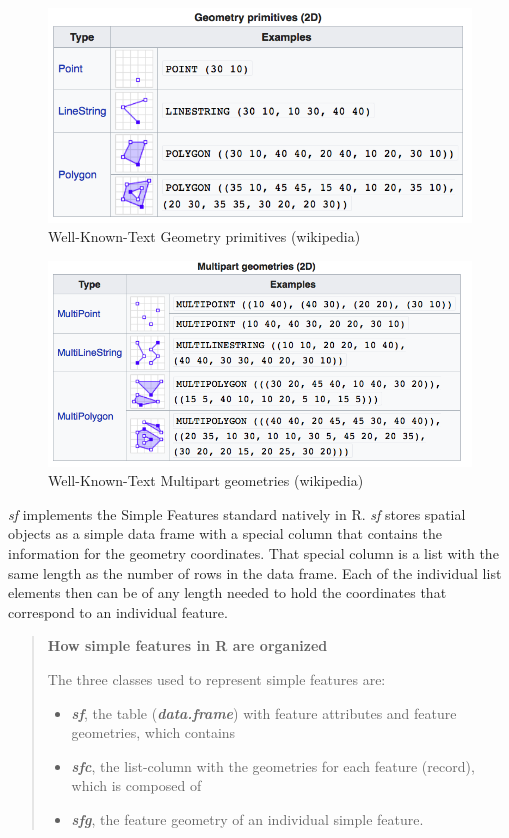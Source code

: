 \documentclass[
  11pt,
]{book}
\providecommand{\tightlist}{%
  \setlength{\itemsep}{0pt}\setlength{\parskip}{0pt}}
\begin{document}
\begin{figure}
\includegraphics[width=1\linewidth]{img/wkt_primitives} \caption{Well-Known-Text Geometry primitives  (wikipedia)}\label{fig:wkt-primitives-sp}
\end{figure}

\begin{figure}
\includegraphics[width=1\linewidth]{img/wkt_multipart} \caption{Well-Known-Text Multipart geometries (wikipedia)}\label{fig:wkt-multipart-sp}
\end{figure}

\emph{sf} implements the Simple Features standard natively in R. \emph{sf} stores spatial objects as a simple data frame with a special column that contains the information for the geometry coordinates. That special column is a list with the same length as the number of rows in the data frame. Each of the individual list elements then can be of any length needed to hold the coordinates that correspond to an individual feature.

\begin{quote}
\textbf{How simple features in R are organized}

The three classes used to represent simple features are:

\begin{itemize}
\tightlist
\item
  \textbf{\emph{sf}}, the table (\textbf{\emph{data.frame}}) with feature attributes and feature geometries, which contains
\item
  \textbf{\emph{sfc}}, the list-column with the geometries for each feature (record), which is composed of
\item
  \textbf{\emph{sfg}}, the feature geometry of an individual simple feature.
\end{itemize}
\end{quote}
\end{document}
